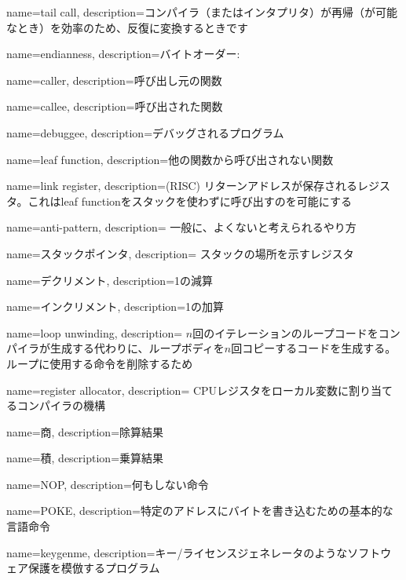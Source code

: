 {
  name=tail call,
  description={コンパイラ（またはインタプリタ）が再帰（が可能なとき）を効率のため、反復に変換するときです}
}

{
  name=endianness,
  description={バイトオーダー: }
}

{
  name=caller,
  description={呼び出し元の関数}
}

{
  name=callee,
  description={呼び出された関数}
}

{
  name=debuggee,
  description={デバッグされるプログラム}
}

{
  name=leaf function,
  description={他の関数から呼び出されない関数}
}

{
  name=link register,
  description=(RISC) リターンアドレスが保存されるレジスタ。これはleaf functionをスタックを使わずに呼び出すのを可能にする
}

{
  name=anti-pattern,
  description=
  {一般に、よくないと考えられるやり方}
}

{
  name={スタックポインタ},
  description=
  {スタックの場所を示すレジスタ}
}

{
  name={デクリメント},
  description={1の減算}
}

{
  name={インクリメント},
  description={1の加算}
}

{
  name=loop unwinding,
  description={
  $n$回のイテレーションのループコードをコンパイラが生成する代わりに、ループボディを$n$回コピーするコードを生成する。
  ループに使用する命令を削除するため}
}

{
  name=register allocator,
  description=
  {CPUレジスタをローカル変数に割り当てるコンパイラの機構}
}

{
  name=商,
  description={除算結果}
}

{
  name=積,
  description={乗算結果}
}

{
  name=NOP,
  description={何もしない命令}
}

{
  name=POKE,
  description={特定のアドレスにバイトを書き込むための基本的な言語命令}
}

{
  name=keygenme,
  description={キー/ライセンスジェネレータのようなソフトウェア保護を模倣するプログラム}
} %

